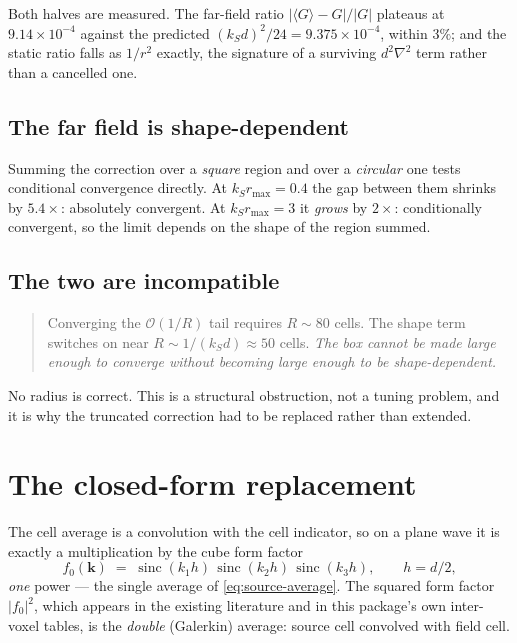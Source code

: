 \documentclass[11pt,a4paper]{article}
\newcommand{\order}{\mathcal{O}}
\newcommand{\avg}[1]{\langle #1 \rangle}
\begin{document}
Both halves are measured. The far-field ratio $|\avg{G}-G|/|G|$ plateaus at
$9.14\times10^{-4}$ against the predicted $(k_Sd)^{2}/24 = 9.375\times10^{-4}$,
within $3\%$; and the static ratio falls as $1/r^{2}$ exactly, the signature of a
surviving $d^{2}\nabla^{2}$ term rather than a cancelled one.

\subsection{The far field is shape-dependent}

Summing the correction over a \emph{square} region and over a \emph{circular}
one tests conditional convergence directly. At $k_S r_{\max}=0.4$ the gap
between them shrinks by $5.4\times$: absolutely convergent. At
$k_S r_{\max}=3$ it \emph{grows} by $2\times$: conditionally convergent, so the
limit depends on the shape of the region summed.

\subsection{The two are incompatible}

\begin{quote}
Converging the $\order(1/R)$ tail requires $R\sim80$ cells. The shape term
switches on near $R \sim 1/(k_S d) \approx 50$ cells. \emph{The box cannot be
made large enough to converge without becoming large enough to be
shape-dependent.}
\end{quote}

No radius is correct. This is a structural obstruction, not a tuning problem,
and it is why the truncated correction had to be replaced rather than extended.

\section{The closed-form replacement}

The cell average is a convolution with the cell indicator, so on a plane wave it
is exactly a multiplication by the cube form factor
%
\begin{equation}
  f_0(\bm{k}) \;=\; \operatorname{sinc}(k_1h)\,\operatorname{sinc}(k_2h)\,
                    \operatorname{sinc}(k_3h), \qquad h=d/2,
  \label{eq:form-factor}
\end{equation}
%
\emph{one} power --- the single average of \eqref{eq:source-average}. The
squared form factor $|f_0|^{2}$, which appears in the existing literature and in
this package's own inter-voxel tables, is the \emph{double} (Galerkin) average:
source cell convolved with field cell.
\end{document}
